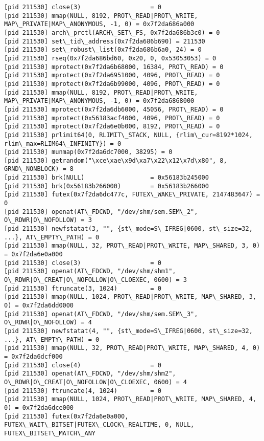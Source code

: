 \documentclass[a4paper, 12pt]{article}
\begin{document}
\begin{lstlisting}
[pid 211530] close(3)                   = 0
[pid 211530] mmap(NULL, 8192, PROT\_READ|PROT\_WRITE, MAP\_PRIVATE|MAP\_ANONYMOUS, -1, 0) = 0x7f2da686a000
[pid 211530] arch\_prctl(ARCH\_SET\_FS, 0x7f2da686b3c0) = 0
[pid 211530] set\_tid\_address(0x7f2da686b690) = 211530
[pid 211530] set\_robust\_list(0x7f2da686b6a0, 24) = 0
[pid 211530] rseq(0x7f2da686bd60, 0x20, 0, 0x53053053) = 0
[pid 211530] mprotect(0x7f2da6b68000, 16384, PROT\_READ) = 0
[pid 211530] mprotect(0x7f2da6951000, 4096, PROT\_READ) = 0
[pid 211530] mprotect(0x7f2da6b99000, 4096, PROT\_READ) = 0
[pid 211530] mmap(NULL, 8192, PROT\_READ|PROT\_WRITE, MAP\_PRIVATE|MAP\_ANONYMOUS, -1, 0) = 0x7f2da6868000
[pid 211530] mprotect(0x7f2da6db6000, 45056, PROT\_READ) = 0
[pid 211530] mprotect(0x56183acf4000, 4096, PROT\_READ) = 0
[pid 211530] mprotect(0x7f2da6e0b000, 8192, PROT\_READ) = 0
[pid 211530] prlimit64(0, RLIMIT\_STACK, NULL, {rlim\_cur=8192*1024, rlim\_max=RLIM64\_INFINITY}) = 0
[pid 211530] munmap(0x7f2da6dc7000, 38295) = 0
[pid 211530] getrandom("\xce\xae\x9d\xa7\x22\x12\x7d\x80", 8, GRND\_NONBLOCK) = 8
[pid 211530] brk(NULL)                  = 0x56183b245000
[pid 211530] brk(0x56183b266000)        = 0x56183b266000
[pid 211530] futex(0x7f2da6dc477c, FUTEX\_WAKE\_PRIVATE, 2147483647) = 0
[pid 211530] openat(AT\_FDCWD, "/dev/shm/sem.SEM\_2", O\_RDWR|O\_NOFOLLOW) = 3
[pid 211530] newfstatat(3, "", {st\_mode=S\_IFREG|0600, st\_size=32, ...}, AT\_EMPTY\_PATH) = 0
[pid 211530] mmap(NULL, 32, PROT\_READ|PROT\_WRITE, MAP\_SHARED, 3, 0) = 0x7f2da6e0a000
[pid 211530] close(3)                   = 0
[pid 211530] openat(AT\_FDCWD, "/dev/shm/shm1", O\_RDWR|O\_CREAT|O\_NOFOLLOW|O\_CLOEXEC, 0600) = 3
[pid 211530] ftruncate(3, 1024)         = 0
[pid 211530] mmap(NULL, 1024, PROT\_READ|PROT\_WRITE, MAP\_SHARED, 3, 0) = 0x7f2da6dd0000
[pid 211530] openat(AT\_FDCWD, "/dev/shm/sem.SEM\_3", O\_RDWR|O\_NOFOLLOW) = 4
[pid 211530] newfstatat(4, "", {st\_mode=S\_IFREG|0600, st\_size=32, ...}, AT\_EMPTY\_PATH) = 0
[pid 211530] mmap(NULL, 32, PROT\_READ|PROT\_WRITE, MAP\_SHARED, 4, 0) = 0x7f2da6dcf000
[pid 211530] close(4)                   = 0
[pid 211530] openat(AT\_FDCWD, "/dev/shm/shm2", O\_RDWR|O\_CREAT|O\_NOFOLLOW|O\_CLOEXEC, 0600) = 4
[pid 211530] ftruncate(4, 1024)         = 0
[pid 211530] mmap(NULL, 1024, PROT\_READ|PROT\_WRITE, MAP\_SHARED, 4, 0) = 0x7f2da6dce000
[pid 211530] futex(0x7f2da6e0a000, FUTEX\_WAIT\_BITSET|FUTEX\_CLOCK\_REALTIME, 0, NULL, FUTEX\_BITSET\_MATCH\_ANY
\end{lstlisting}
\end{document}
